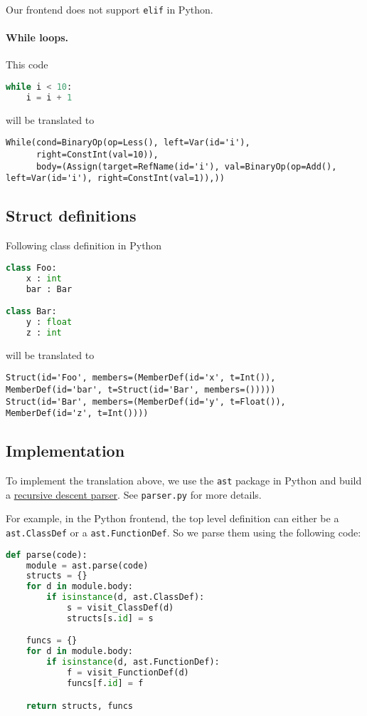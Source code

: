 Our frontend does not support \lstinline{elif} in Python.

\paragraph{While loops.} This code
\begin{lstlisting}[language=python]
while i < 10:
    i = i + 1
\end{lstlisting}
will be translated to
\begin{lstlisting}
While(cond=BinaryOp(op=Less(), left=Var(id='i'),
      right=ConstInt(val=10)),
      body=(Assign(target=RefName(id='i'), val=BinaryOp(op=Add(), left=Var(id='i'), right=ConstInt(val=1)),))
\end{lstlisting}

\subsection{Struct definitions}
Following class definition in Python
\begin{lstlisting}[language=Python]
class Foo:
    x : int
    bar : Bar

class Bar:
    y : float
    z : int
\end{lstlisting}
will be translated to
\begin{lstlisting}
Struct(id='Foo', members=(MemberDef(id='x', t=Int()), MemberDef(id='bar', t=Struct(id='Bar', members=()))))
Struct(id='Bar', members=(MemberDef(id='y', t=Float()), MemberDef(id='z', t=Int())))
\end{lstlisting}

\subsection{Implementation}

To implement the translation above, we use the \lstinline{ast} package in Python and build a \href{https://en.wikipedia.org/wiki/Recursive_descent_parser}{recursive descent parser}. See \lstinline{parser.py} for more details.

For example, in the Python frontend, the top level definition can either be a \lstinline{ast.ClassDef} or a \lstinline{ast.FunctionDef}. So we parse them using the following code:
\begin{lstlisting}[language=Python]
def parse(code):
    module = ast.parse(code)
    structs = {}
    for d in module.body:
        if isinstance(d, ast.ClassDef):
            s = visit_ClassDef(d)
            structs[s.id] = s

    funcs = {}
    for d in module.body:
        if isinstance(d, ast.FunctionDef):
            f = visit_FunctionDef(d)
            funcs[f.id] = f

    return structs, funcs
\end{lstlisting}

